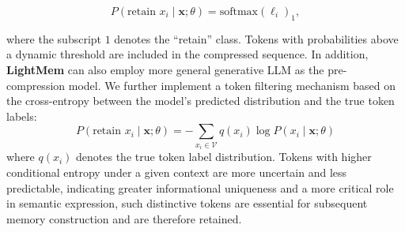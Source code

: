\[
P(\text{retain } x_i \mid \mathbf{x}; \theta) = \mathrm{softmax}(\ell_i)_1,
\]

where the subscript $1$ denotes the ``retain'' class. Tokens with probabilities above a dynamic threshold are included in the compressed sequence.
In addition, \textbf{LightMem} can also employ more general generative LLM as the pre-compression model. 
We further implement a token filtering mechanism based on the cross-entropy between the model’s predicted distribution and the true token labels: 
\[
P(\text{retain } x_i \mid \mathbf{x}; \theta) = -\sum_{x_i \in \mathcal{V}} q(x_i) \log P(x_i \mid \mathbf{x}; \theta)
\]
where $q(x_i)$ denotes the true token label distribution.
Tokens with higher conditional entropy under a given context are more uncertain and less predictable, indicating greater informational uniqueness and a more critical role in semantic expression, such distinctive tokens are essential for subsequent memory construction and are therefore retained.

